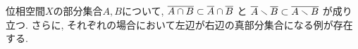 \documentclass[uplatex, dvipdfmx, a4paper, 12pt, class=jsarticle, crop=false]{standalone}
\begin{document}
\begin{problem}[1.1.A]\label{eng-1-1-A-problem}
	位相空間\(X\)の部分集合\(A, B\)について,
	\(\overline{A \cap B} \subset \overline{A} \cap \overline{B}\)
	と
	\(\overline{A} \smallsetminus \overline{B} \subset \overline{A \smallsetminus B}\)
	が成り立つ.
	さらに, それぞれの場合において左辺が右辺の真部分集合になる例が存在する.
\end{problem}
\end{document}
